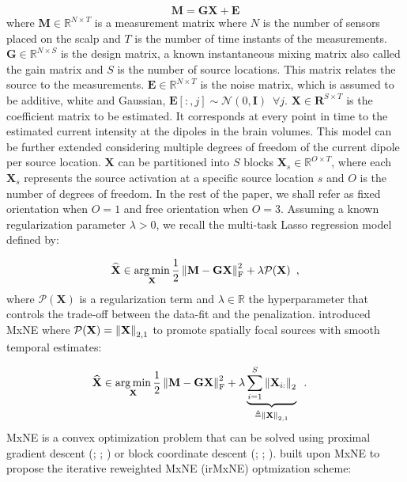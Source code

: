 \begin{equation} \label{eq:1}
    \mathbf{M = GX + E}
\end{equation}
%
where $\mathbf{M} \in \mathbb{R}^{N \times T}$ is a measurement matrix where $N$ is the
number of sensors placed on the scalp and $T$ is the number of time instants of the measurements.
$\mathbf{G} \in \mathbb{R}^{N \times S}$ is the design matrix, a known
instantaneous mixing matrix also called the gain matrix and $S$ is the number of source locations.
This matrix relates the source
to the measurements. $\mathbf{E} \in \mathbb{R}^{N \times T}$ is the noise matrix, which
is assumed to be additive, white and Gaussian, $\mathbf{E}[:,j] \sim \mathcal{N}(0, \mathbf{I})
\enspace \forall j$. $\mathbf{X} \in \mathbf{R}^{S \times T}$ is the coefficient matrix to be estimated.
It corresponds at every point in time to the estimated current intensity at the dipoles in
the brain volumes. This model can be further extended considering multiple degrees of freedom of the current dipole
per source location. $\mathbf{X}$ can be partitioned into $S$ blocks $\mathbf{X}_s \in \mathbb{R}^{O \times T}$, where
each $\mathbf{X}_s$ represents the source activation at a specific source location $s$ and $O$ is the number of
degrees of freedom. In the rest of the paper, we shall refer as fixed orientation when $O = 1$ and
free orientation when $O = 3$. Assuming a known regularization parameter $\lambda > 0$, we recall the multi-task
Lasso regression model defined by:

\begin{equation} \label{eq:2}
    \widehat{\mathbf{X}} \in \operatorname*{arg\,min}_{\mathbf{X}}
    \frac{1}{2}\left \lVert \mathbf{M - GX} \right \rVert^2_{\text{F}}
    + \lambda \mathcal{P}(\mathbf{X})
    \enspace ,
\end{equation}
%
where $\mathcal{P}(\mathbf{X})$ is a regularization term and $\lambda \in \mathbb{R}$ the hyperparameter
that controls the trade-off between the data-fit and the penalization. \cite{Gramfort_Kowalski_Hamalainen12}
introduced MxNE where $\mathcal{P}(\mathbf{X}) = \left \lVert \mathbf{X} \right \rVert_{2, 1}$ to promote spatially focal sources with
smooth temporal estimates:

\begin{align} \label{eq:3}
    \widehat{\mathbf{X}}
    &\in
    \operatorname*{arg\,min}_{\mathbf{X}}
    \frac{1}{2}\left \lVert \mathbf{M - GX} \right \rVert^2_{\text{F}}
    + \lambda
    \underbrace{\sum_{i=1}^{S} \left \lVert \mathbf{X}_{i:} \right \rVert_{2}}_{\triangleq \left \lVert \mathbf{X} \right \rVert_{2, 1}}
    \enspace .
\end{align}
%
MxNE is a convex optimization problem that can be solved using proximal gradient descent (\cite{Nesterov05}; \cite{Nesterov09}; \cite{Beck_Teboulle09})
or block coordinate descent (\cite{Tseng_Yun09}; \cite{Wright2015}; \cite{Massias_Vaiter_Gramfort_Salmon20}). \cite{Strohmeier_Bekhti_Haueisen_Gramfort_2016} built upon MxNE to propose the iterative reweighted MxNE (irMxNE) optmization
scheme:

